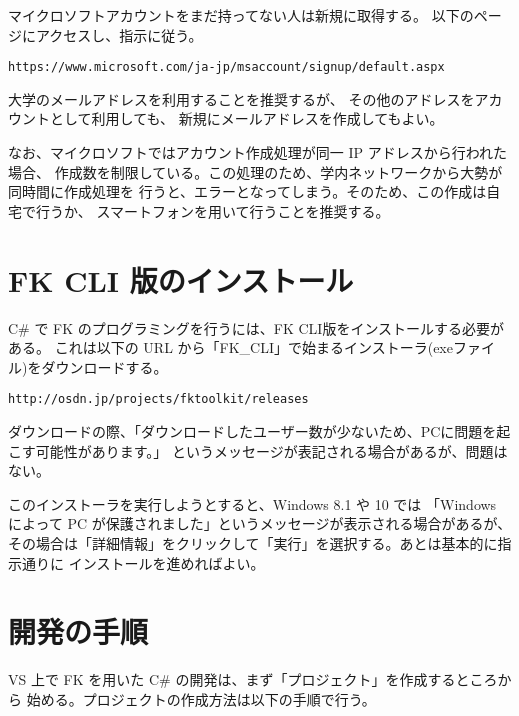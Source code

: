 \documentclass[a4paper]{jsarticle}
\begin{document}
マイクロソフトアカウントをまだ持ってない人は新規に取得する。
以下のページにアクセスし、指示に従う。
\begin{screen}
\begin{center}
	\verb+https://www.microsoft.com/ja-jp/msaccount/signup/default.aspx+
\end{center}
\end{screen}
大学のメールアドレスを利用することを推奨するが、
その他のアドレスをアカウントとして利用しても、
新規にメールアドレスを作成してもよい。

なお、マイクロソフトではアカウント作成処理が同一 IP アドレスから行われた場合、
作成数を制限している。この処理のため、学内ネットワークから大勢が同時間に作成処理を
行うと、エラーとなってしまう。そのため、この作成は自宅で行うか、
スマートフォンを用いて行うことを推奨する。

\section{FK CLI 版のインストール}

C\# で FK のプログラミングを行うには、FK CLI版をインストールする必要がある。
これは以下の URL から「FK\_CLI」で始まるインストーラ(exeファイル)をダウンロードする。

\begin{screen}
\begin{center}
	\verb+http://osdn.jp/projects/fktoolkit/releases+
\end{center}
\end{screen}
ダウンロードの際、「ダウンロードしたユーザー数が少ないため、PCに問題を起こす可能性があります。」
というメッセージが表記される場合があるが、問題はない。

このインストーラを実行しようとすると、Windows 8.1 や 10 では
「Windows によって PC が保護されました」というメッセージが表示される場合があるが、
その場合は「詳細情報」をクリックして「実行」を選択する。あとは基本的に指示通りに
インストールを進めればよい。

\section{開発の手順}

VS 上で FK を用いた C\# の開発は、まず「プロジェクト」を作成するところから
始める。プロジェクトの作成方法は以下の手順で行う。
\end{document}
